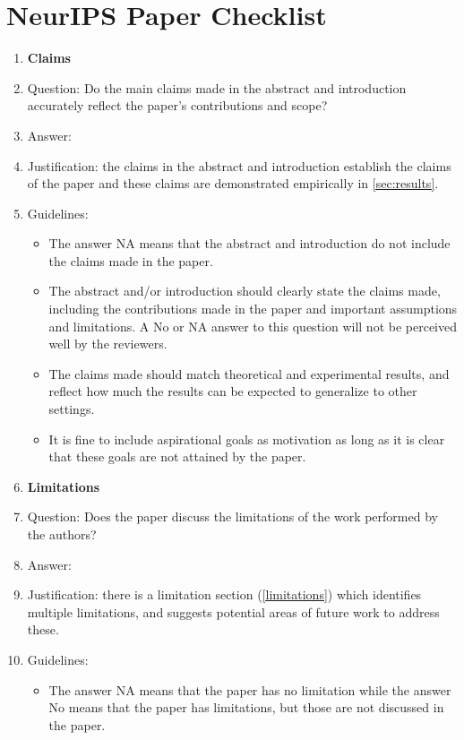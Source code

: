\documentclass{article}
\begin{document}
\section*{NeurIPS Paper Checklist}
\begin{enumerate}
\item {\bf Claims}
    \item[] Question: Do the main claims made in the abstract and introduction accurately reflect the paper's contributions and scope?
    \item[] Answer: \answerYes{}
    \item[] Justification: the claims in the abstract and introduction establish the claims of the paper and these claims are demonstrated empirically in \cref{sec:results}.
    \item[] Guidelines:
    \begin{itemize}
        \item The answer NA means that the abstract and introduction do not include the claims made in the paper.
        \item The abstract and/or introduction should clearly state the claims made, including the contributions made in the paper and important assumptions and limitations. A No or NA answer to this question will not be perceived well by the reviewers.
        \item The claims made should match theoretical and experimental results, and reflect how much the results can be expected to generalize to other settings.
        \item It is fine to include aspirational goals as motivation as long as it is clear that these goals are not attained by the paper.
    \end{itemize}
\item {\bf Limitations}
    \item[] Question: Does the paper discuss the limitations of the work performed by the authors?
    \item[] Answer: \answerYes{}
    \item[] Justification: there is a limitation section (\cref{limitations}) which identifies multiple limitations, and suggests potential areas of future work to address these.
    \item[] Guidelines:
    \begin{itemize}
        \item The answer NA means that the paper has no limitation while the answer No means that the paper has limitations, but those are not discussed in the paper.

\end{itemize}
\end{enumerate}
\end{document}
